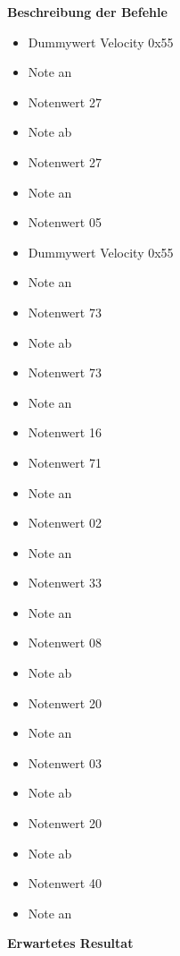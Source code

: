 \textbf{Beschreibung der Befehle}

\begin{itemize}
	\item Dummywert Velocity 0x55
	\item Note an 
	\item Notenwert 27
	\item Note ab 
	\item Notenwert 27
	\item Note an
	\item Notenwert 05
\end{itemize}

\begin{itemize}
	\item Dummywert Velocity 0x55
	\item Note an
	\item Notenwert 73
	\item Note ab
	\item Notenwert 73
	\item Note an
	\item Notenwert 16
\end{itemize}

\begin{itemize}
	\item Notenwert 71
	\item Note an
	\item Notenwert 02
	\item Note an
	\item Notenwert 33
	\item Note an
	\item Notenwert 08
	\item Note ab
\end{itemize}

\begin{itemize}
	\item Notenwert 20
	\item Note an
	\item Notenwert 03
	\item Note ab
	\item Notenwert 20
	\item Note ab
	\item Notenwert 40
	\item Note an
\end{itemize}

\textbf{Erwartetes Resultat}

